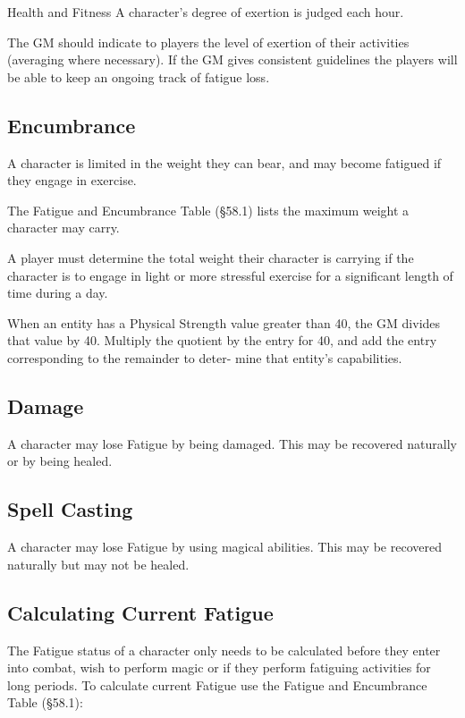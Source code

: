 \begin{Chapter}{Health and Fitness}
A character’s degree of exertion is judged each hour.

The GM should indicate to players the level of exertion of their
activities (averaging where necessary).  If the GM gives consistent
guidelines the players will be able to keep an ongoing track of
fatigue loss.

\subsection{Encumbrance}

A character is limited in the weight they can bear, and may become
fatigued if they engage in exercise.

The Fatigue and Encumbrance Table (§58.1) lists the maximum weight a
character may carry.

A player must determine the total weight their character is carrying
if the character is to engage in light or more stressful exercise for
a significant length of time during a day.

When an entity has a Physical Strength value greater than 40, the GM
divides that value by 40.  Multiply the quotient by the entry for 40,
and add the entry corresponding to the remainder to deter- mine that
entity’s capabilities.

\subsection{Damage}

A character may lose Fatigue by being damaged.  This may be recovered
naturally or by being healed.

\subsection{Spell Casting}

A character may lose Fatigue by using magical abilities. This may be
recovered naturally but may not be healed.

\subsection{Calculating Current Fatigue}

The Fatigue status of a character only needs to be calculated before
they enter into combat, wish to perform magic or if they perform
fatiguing activities for long periods.  To calculate current Fatigue
use the Fatigue and Encumbrance Table (§58.1):


\end{Chapter}
